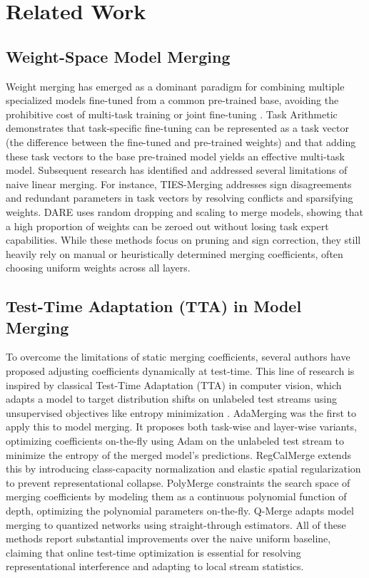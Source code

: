 \section{Related Work}
\label{sec:related}

\subsection{Weight-Space Model Merging}
Weight merging has emerged as a dominant paradigm for combining multiple specialized models fine-tuned from a common pre-trained base, avoiding the prohibitive cost of multi-task training or joint fine-tuning \cite{wortsman2022model, ilharco2022editing}. Task Arithmetic \cite{ilharco2022editing} demonstrates that task-specific fine-tuning can be represented as a task vector (the difference between the fine-tuned and pre-trained weights) and that adding these task vectors to the base pre-trained model yields an effective multi-task model.
Subsequent research has identified and addressed several limitations of naive linear merging. For instance, TIES-Merging \cite{yadav2023ties} addresses sign disagreements and redundant parameters in task vectors by resolving conflicts and sparsifying weights. DARE \cite{yu2023language} uses random dropping and scaling to merge models, showing that a high proportion of weights can be zeroed out without losing task expert capabilities. 
While these methods focus on pruning and sign correction, they still heavily rely on manual or heuristically determined merging coefficients, often choosing uniform weights across all layers.

\subsection{Test-Time Adaptation (TTA) in Model Merging}
To overcome the limitations of static merging coefficients, several authors have proposed adjusting coefficients dynamically at test-time. This line of research is inspired by classical Test-Time Adaptation (TTA) in computer vision, which adapts a model to target distribution shifts on unlabeled test streams using unsupervised objectives like entropy minimization \cite{wang2020tent, liang2023source}.
AdaMerging \cite{adamerging} was the first to apply this to model merging. It proposes both task-wise and layer-wise variants, optimizing coefficients on-the-fly using Adam on the unlabeled test stream to minimize the entropy of the merged model's predictions. RegCalMerge \cite{regcalmerge} extends this by introducing class-capacity normalization and elastic spatial regularization to prevent representational collapse. PolyMerge \cite{polymerge} constraints the search space of merging coefficients by modeling them as a continuous polynomial function of depth, optimizing the polynomial parameters on-the-fly. Q-Merge \cite{qmerge} adapts model merging to quantized networks using straight-through estimators.
All of these methods report substantial improvements over the naive uniform baseline, claiming that online test-time optimization is essential for resolving representational interference and adapting to local stream statistics.

